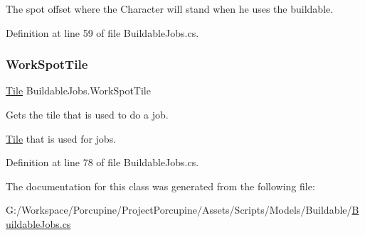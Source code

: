The spot offset where the Character will stand when he uses the buildable.

Definition at line 59 of file Buildable\+Jobs.\+cs.

\mbox{\label{class_buildable_jobs_a04c116e0984a4f16eacc43437e75a971}} 
\subsubsection{\texorpdfstring{Work\+Spot\+Tile}{WorkSpotTile}}
{\footnotesize\ttfamily \hyperlink{class_tile}{Tile} Buildable\+Jobs.\+Work\+Spot\+Tile\hspace{0.3cm}{\ttfamily [get]}}



Gets the tile that is used to do a job. 

\hyperlink{class_tile}{Tile} that is used for jobs.

Definition at line 78 of file Buildable\+Jobs.\+cs.



The documentation for this class was generated from the following file\+:\begin{DoxyCompactItemize}
\item 
G\+:/\+Workspace/\+Porcupine/\+Project\+Porcupine/\+Assets/\+Scripts/\+Models/\+Buildable/\hyperlink{_buildable_jobs_8cs}{Buildable\+Jobs.\+cs}\end{DoxyCompactItemize}
